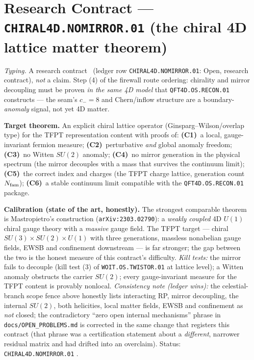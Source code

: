 \section*{Research Contract --- \texttt{CHIRAL4D.NOMIRROR.01} (the chiral 4D lattice matter theorem)}
\noindent\emph{Typing.} A research contract \mO\ (ledger row \texttt{CHIRAL4D.NOMIRROR.01}:
Open, research contract), \emph{not} a claim.  Step (4) of the firewall route ordering: chirality
and mirror decoupling must be proven \emph{in the same 4D model} that
\texttt{QFT4D.OS.RECON.01} constructs --- the seam's $c_-{=}8$ and Chern/inflow structure are a
boundary-\emph{anomaly} signal, not yet 4D matter.

\par\smallskip\noindent\textbf{Target theorem.}  An explicit chiral lattice operator
(Ginsparg--Wilson/overlap type) for the TFPT representation content with proofs of:
\textbf{(C1)}~a local, gauge-invariant fermion measure; \textbf{(C2)}~perturbative \emph{and}
global anomaly freedom; \textbf{(C3)}~no Witten $SU(2)$ anomaly; \textbf{(C4)}~no mirror
generation in the physical spectrum (the mirror decouples with a mass that survives the
continuum limit); \textbf{(C5)}~the correct index and charges (the TFPT charge lattice,
generation count $N_{\mathrm{fam}}$); \textbf{(C6)}~a stable continuum limit compatible with the
\texttt{QFT4D.OS.RECON.01} package.

\par\smallskip\noindent\textbf{Calibration (state of the art, honestly).}  The strongest
comparable theorem is Mastropietro's construction (\texttt{arXiv:2303.02790}): a \emph{weakly
coupled} 4D $U(1)$ chiral gauge theory with a \emph{massive} gauge field.  The TFPT target ---
chiral $SU(3){\times}SU(2){\times}U(1)$ with three generations, massless nonabelian gauge
fields, EWSB and confinement downstream --- is far stronger; the gap between the two is the
honest measure of this contract's difficulty.  \emph{Kill tests:} the mirror fails to decouple
(kill test (3) of \texttt{WOIT.OS.TWISTOR.01} at lattice level); a Witten anomaly obstructs the
carrier $SU(2)$; every gauge-invariant measure for the TFPT content is provably nonlocal.
\emph{Consistency note (ledger wins):} the celestial-branch scope fence above honestly lists
interacting RP, mirror decoupling, the internal $SU(2)$, both helicities, local matter fields,
EWSB and confinement as \emph{not} closed; the contradictory ``zero open internal mechanisms''
phrase in \texttt{docs/OPEN\_PROBLEMS.md} is corrected in the same change that registers this
contract (that phrase was a certification statement about a \emph{different}, narrower residual
matrix and had drifted into an overclaim).  Status: \texttt{CHIRAL4D.NOMIRROR.01} \mO.

